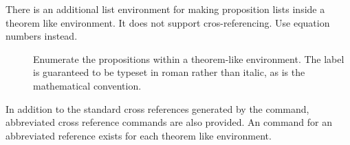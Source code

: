 \documentclass[11pt,a4paper,oneside,titlepage]{alb-latex}
\begin{document}
There is an additional list environment for making proposition lists
inside a theorem like environment.  It does not support
cros-referencing.  Use equation numbers instead.

\begin{description}
\item[] Enumerate the propositions within a
  theorem-like environment.  The label is guaranteed to be typeset in
  roman rather than italic, as is the mathematical convention.
\end{description}

In addition to the standard cross references generated by the
 command, abbreviated cross reference commands are also
provided.  An command for an abbreviated reference exists for each
theorem like environment.
\end{document}
